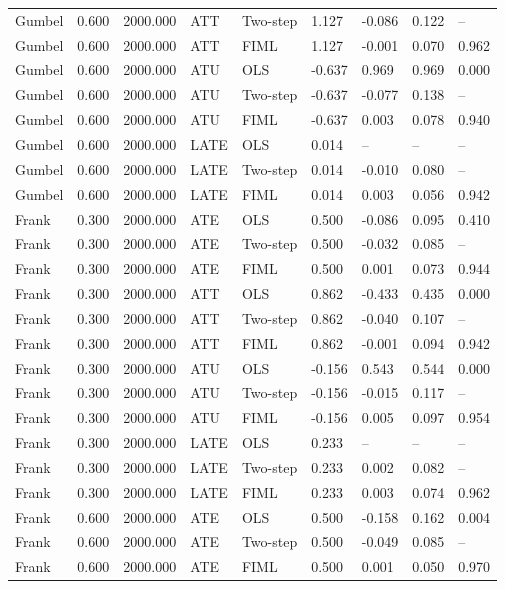 \begin{table}[htbp]
\begin{tabular}{lllllllll}
Gumbel & 0.600 & 2000.000 & ATT & Two-step & 1.127 & -0.086 & 0.122 & -- \\
Gumbel & 0.600 & 2000.000 & ATT & FIML & 1.127 & -0.001 & 0.070 & 0.962 \\
Gumbel & 0.600 & 2000.000 & ATU & OLS & -0.637 & 0.969 & 0.969 & 0.000 \\
Gumbel & 0.600 & 2000.000 & ATU & Two-step & -0.637 & -0.077 & 0.138 & -- \\
Gumbel & 0.600 & 2000.000 & ATU & FIML & -0.637 & 0.003 & 0.078 & 0.940 \\
Gumbel & 0.600 & 2000.000 & LATE & OLS & 0.014 & -- & -- & -- \\
Gumbel & 0.600 & 2000.000 & LATE & Two-step & 0.014 & -0.010 & 0.080 & -- \\
Gumbel & 0.600 & 2000.000 & LATE & FIML & 0.014 & 0.003 & 0.056 & 0.942 \\
Frank & 0.300 & 2000.000 & ATE & OLS & 0.500 & -0.086 & 0.095 & 0.410 \\
Frank & 0.300 & 2000.000 & ATE & Two-step & 0.500 & -0.032 & 0.085 & -- \\
Frank & 0.300 & 2000.000 & ATE & FIML & 0.500 & 0.001 & 0.073 & 0.944 \\
Frank & 0.300 & 2000.000 & ATT & OLS & 0.862 & -0.433 & 0.435 & 0.000 \\
Frank & 0.300 & 2000.000 & ATT & Two-step & 0.862 & -0.040 & 0.107 & -- \\
Frank & 0.300 & 2000.000 & ATT & FIML & 0.862 & -0.001 & 0.094 & 0.942 \\
Frank & 0.300 & 2000.000 & ATU & OLS & -0.156 & 0.543 & 0.544 & 0.000 \\
Frank & 0.300 & 2000.000 & ATU & Two-step & -0.156 & -0.015 & 0.117 & -- \\
Frank & 0.300 & 2000.000 & ATU & FIML & -0.156 & 0.005 & 0.097 & 0.954 \\
Frank & 0.300 & 2000.000 & LATE & OLS & 0.233 & -- & -- & -- \\
Frank & 0.300 & 2000.000 & LATE & Two-step & 0.233 & 0.002 & 0.082 & -- \\
Frank & 0.300 & 2000.000 & LATE & FIML & 0.233 & 0.003 & 0.074 & 0.962 \\
Frank & 0.600 & 2000.000 & ATE & OLS & 0.500 & -0.158 & 0.162 & 0.004 \\
Frank & 0.600 & 2000.000 & ATE & Two-step & 0.500 & -0.049 & 0.085 & -- \\
Frank & 0.600 & 2000.000 & ATE & FIML & 0.500 & 0.001 & 0.050 & 0.970 \\

\end{tabular}
\end{table}
